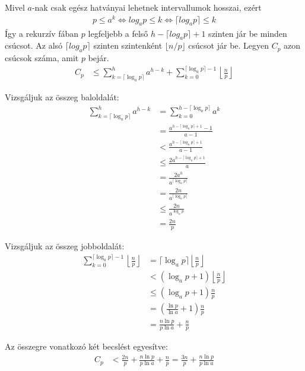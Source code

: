 \documentclass[12pt]{report}
\begin{document}
Mivel $a$-nak csak egész hatványai lehetnek intervallumok hosszai, ezért
\begin{align*}
p \le a^k
\Leftrightarrow log_{a}{p} \le k
\Leftrightarrow \lceil log_{a}{p} \rceil \le k
\end{align*}
Így a rekurzív fában $p$ legfeljebb a felső
$h - \lceil log_{a}{p} \rceil + 1$ szinten jár be minden csúcsot.
Az alsó $\lceil log_{a}{p} \rceil$ szinten szintenként $\lfloor n/p \rfloor$
csúcsot jár be.
Legyen $C_p$ azon csúcsok száma, amit $p$ bejár.
\begin{align*}
C_p
&\le \sum_{k=\lceil \log_{a}{p} \rceil}^h a^{h-k}
+ \sum_{k=0}^{\lceil \log_{a}{p} \rceil - 1} \left\lfloor \frac{n}{p} \right\rfloor
\end{align*}

Vizsgáljuk az összeg baloldalát:
\begin{align*}
\sum_{k=\lceil \log_{a}{p} \rceil}^h a^{h-k}
&= \sum_{k=0}^{h-\lceil \log_{a}{p} \rceil} a^k \\
&= \frac{a^{h-\lceil \log_{a}{p} \rceil + 1}-1}{a-1} \\
&< \frac{a^{h-\lceil \log_{a}{p} \rceil + 1}}{a-1} \\
&\le \frac{2a^{h-\lceil \log_{a}{p} \rceil + 1}}{a} \\
&= \frac{2a^h}{a^{\lceil \log_{a}{p} \rceil}} \\
&= \frac{2n}{a^{\lceil \log_{a}{p} \rceil}} \\
&\le \frac{2n}{a^{\log_{a}{p}}} \\
&= \frac{2n}{p}
\end{align*}

Vizsgáljuk az összeg jobboldalát:
\begin{align*}
\sum_{k=0}^{\lceil \log_{a}{p} \rceil - 1} \left\lfloor \frac{n}{p} \right\rfloor
&= \lceil \log_{a}{p} \rceil \left\lfloor \frac{n}{p} \right\rfloor \\
&< (\log_{a}{p} + 1) \left\lfloor \frac{n}{p} \right\rfloor \\
&\le (\log_{a}{p} + 1) \frac{n}{p} \\
&= \left( \frac{\ln{p}}{\ln{a}} + 1 \right) \frac{n}{p} \\
&= \frac{n \ln{p}}{p \ln{a}} + \frac{n}{p}
\end{align*}

Az összegre vonatkozó két becslést egyesítve:
\begin{align*}
C_p &< \frac{2n}{p} + \frac{n \ln{p}}{p \ln{a}} + \frac{n}{p}
= \frac{3n}{p} + \frac{n \ln{p}}{p \ln{a}}
\end{align*}
\end{document}
